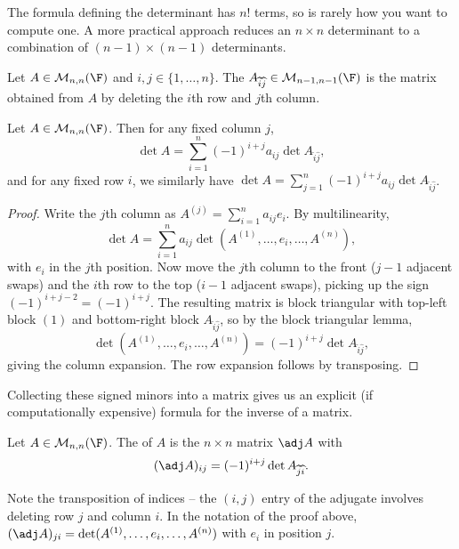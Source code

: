 The formula defining the determinant has $n!$ terms, so is rarely how you want to compute one. A more practical approach reduces an $n \times n$ determinant to a combination of $(n-1) \times (n-1)$ determinants.

\begin{definition}[Minor]
    Let $A \in \mathcal{M}_{n,n}(\F)$ and $i, j \in \{1, \dots, n\}$. The  $A_{\widehat{i}\widehat{j}} \in \mathcal{M}_{n - 1, n-1}(\F)$ is the matrix obtained from $A$ by deleting the $i$th row and $j$th column.
\end{definition}

\begin{lemma}
    Let $A \in \mathcal{M}_{n,n}(\F)$. Then for any fixed column $j$,
    $$
    \det A = \sum_{i = 1}^n (-1)^{i + j} a_{ij} \det A_{\widehat{i}\widehat{j}},
    $$
    and for any fixed row $i$, we similarly have $\det A = \sum_{j = 1}^n (-1)^{i+j}a_{ij} \det A_{\widehat{i}\widehat{j}}$.
\end{lemma}
\begin{proof}
    Write the $j$th column as $A^{(j)} = \sum_{i = 1}^n a_{ij}e_i$. By multilinearity,
    $$
    \det A = \sum_{i = 1}^n a_{ij} \det (A^{(1)}, \dots, e_i, \dots, A^{(n)}),
    $$
    with $e_i$ in the $j$th position. Now move the $j$th column to the front ($j - 1$ adjacent swaps) and the $i$th row to the top ($i - 1$ adjacent swaps), picking up the sign $(-1)^{i + j - 2} = (-1)^{i+j}$. The resulting matrix is block triangular with top-left block $(1)$ and bottom-right block $A_{\widehat{i}\widehat{j}}$, so by the block triangular lemma,
    $$
    \det(A^{(1)}, \dots, e_i, \dots, A^{(n)}) = (-1)^{i + j}\det A_{\widehat{i}\widehat{j}},
    $$
    giving the column expansion. The row expansion follows by transposing.
\end{proof}

Collecting these signed minors into a matrix gives us an explicit (if computationally expensive) formula for the inverse of a matrix.

\begin{definition}[Adjugate]
    Let $A \in \mathcal{M}_{n,n}(\F)$. The  of $A$ is the $n \times n$ matrix $\adj A$ with
    $$
    (\adj A)_{ij} = (-1)^{i + j} \det A_{\widehat{j}\widehat{i}}.
    $$
\end{definition}

Note the transposition of indices -- the $(i,j)$ entry of the adjugate involves deleting row $j$ and column $i$. In the notation of the proof above, $(\adj A)_{ji} = \det(A^{(1)}, \dots, e_i, \dots, A^{(n)})$ with $e_i$ in position $j$.

